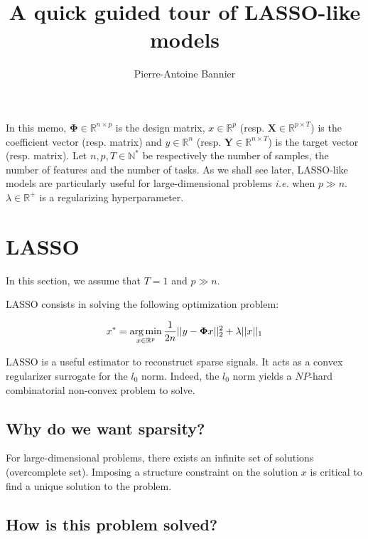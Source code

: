 \documentclass[a4paper,10pt]{article}
\author{Pierre-Antoine Bannier}
\title{A quick guided tour of LASSO-like models}
\theoremstyle{definition}
\begin{document}
\maketitle

\vskip 0.3in

In this memo, $\mathbf{\Phi} \in \mathbb{R}^{n \times p}$ is the design matrix, $x \in \mathbb{R}^{p}$ (resp. $\mathbf{X} \in \mathbb{R}^{p \times T}$) is the coefficient vector (resp. matrix) and $y \in \mathbb{R}^n$
(resp. $\mathbf{Y} \in \mathbb{R}^{n \times T}$) is the target vector (resp. matrix). Let $n, p, T \in \mathbb{N}^*$ be respectively the number of samples, the number of features and the number of tasks. As we shall see later, LASSO-like models
are particularly useful for large-dimensional problems \textit{i.e.} when $p \gg n$. $\lambda \in \mathbb{R}^+$ is a regularizing hyperparameter.

\section{LASSO}
\label{section_1}

In this section, we assume that $T = 1$ and $p \gg n$.

\vskip 0.2in

LASSO consists in solving the following optimization problem:

\begin{equation*}
    x^* = \operatorname*{arg\,min}_{x \in \mathbb{R}^{p}} \frac{1}{2n}\lvert\lvert y - \mathbf{\Phi} x \rvert\rvert_2^2 + \lambda \lvert\lvert x \rvert\rvert_{1}
\end{equation*}

\vskip 0.1in

LASSO is a useful estimator to reconstruct sparse signals. It acts as a convex regularizer surrogate for the $l_0$ norm. Indeed, the
$l_0$ norm yields a $NP$-hard combinatorial non-convex problem to solve. \\

\subsection*{Why do we want sparsity?}

For large-dimensional problems, there exists an infinite set of solutions (overcomplete set).
Imposing a structure constraint on the solution $x$ is critical to find a unique solution to the problem.

\subsection*{How is this problem solved?}
\end{document}
